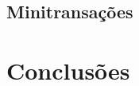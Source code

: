 \documentclass[11pt,twoside,a4paper]{book}
\renewcommand{\chaptermark}[1]{\markboth{\MakeUppercase{#1}}{}}
\begin{document}
\section{Minitransações}
\label{sec:minitransacoes}

\chapter{Conclusões}
\label{chap:conclusoes}

\renewcommand{\chaptermark}[1]{\markboth{\MakeUppercase{\appendixname\ \thechapter}} {\MakeUppercase{#1}} }
\fancyhead[RE,LO]{}
\appendix

% 

\backmatter \singlespacing   %

\end{document}
